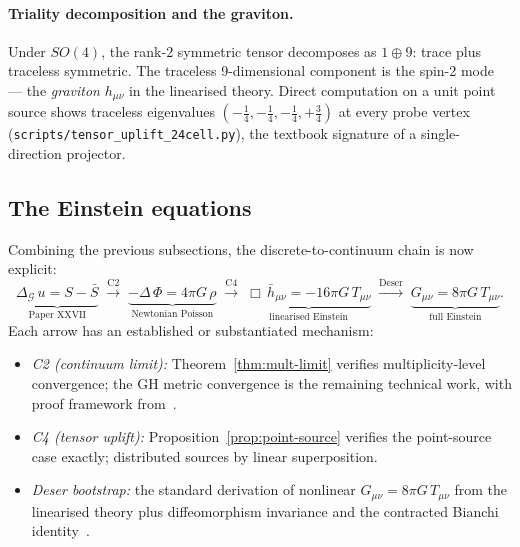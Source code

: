 \documentclass[12pt]{article}
\newcommand{\Gcal}{\mathcal{G}}
\begin{document}
\paragraph{Triality decomposition and the graviton.} Under $SO(4)$, the rank-2 symmetric tensor decomposes as $1 \oplus 9$: trace plus traceless symmetric. The traceless 9-dimensional component is the spin-2 mode --- the \emph{graviton} $h_{\mu\nu}$ in the linearised theory. Direct computation on a unit point source shows traceless eigenvalues $(-\tfrac{1}{4}, -\tfrac{1}{4}, -\tfrac{1}{4}, +\tfrac{3}{4})$ at every probe vertex (\texttt{scripts/tensor\_uplift\_24cell.py}), the textbook signature of a single-direction projector.

\subsection{The Einstein equations}\label{sec:gr:einstein}

Combining the previous subsections, the discrete-to-continuum chain is now explicit:
\begin{equation}\label{eq:einstein-chain}
\underbrace{\Delta_\Gcal\, u = S - \bar{S}}_{\text{Paper XXVII}}
\;\xrightarrow{\text{C2}}\;
\underbrace{-\Delta\, \Phi = 4\pi G\, \rho}_{\text{Newtonian Poisson}}
\;\xrightarrow{\text{C4}}\;
\underbrace{\Box\, \bar{h}_{\mu\nu} = -16\pi G\, T_{\mu\nu}}_{\text{linearised Einstein}}
\;\xrightarrow{\text{Deser}}\;
\underbrace{G_{\mu\nu} = 8\pi G\, T_{\mu\nu}}_{\text{full Einstein}}.
\end{equation}
Each arrow has an established or substantiated mechanism:
\begin{itemize}
    \item \emph{C2 (continuum limit):} Theorem~\ref{thm:mult-limit} verifies multiplicity-level convergence; the GH metric convergence is the remaining technical work, with proof framework from~\citep{BBI2001,CheegerColding1997}.
    \item \emph{C4 (tensor uplift):} Proposition~\ref{prop:point-source} verifies the point-source case exactly; distributed sources by linear superposition.
    \item \emph{Deser bootstrap:} the standard derivation of nonlinear $G_{\mu\nu} = 8\pi G\, T_{\mu\nu}$ from the linearised theory plus diffeomorphism invariance and the contracted Bianchi identity~\citep{Deser1970}.
\end{itemize}
\end{document}
